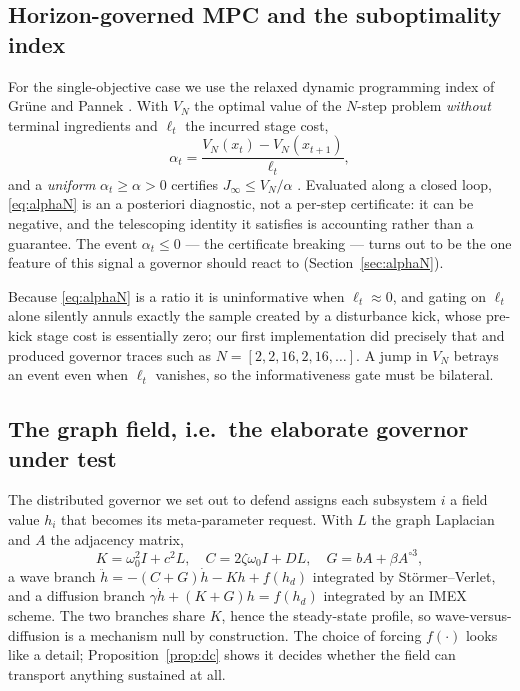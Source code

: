 \documentclass[journal]{IEEEtran}
\theoremstyle{definition}
\begin{document}
\subsection{Horizon-governed MPC and the suboptimality index}
For the single-objective case we use the relaxed dynamic programming index of
Gr\"une and Pannek
\cite{gruene2017nmpc,gruene2009analysis,lincoln2006relaxing}. With $V_N$ the
optimal value of the $N$-step problem \emph{without} terminal ingredients and
$\ell_t$ the incurred stage cost,
\begin{equation}
\alpha_t=\frac{V_N(x_t)-V_N(x_{t+1})}{\ell_t},
\label{eq:alphaN}
\end{equation}
and a \emph{uniform} $\alpha_t\ge\alpha>0$ certifies $J_\infty\le V_N/\alpha$
\cite{gruene2009analysis}. Evaluated along a closed loop, \eqref{eq:alphaN} is
an a posteriori diagnostic, not a per-step certificate: it can be negative, and
the telescoping identity it satisfies is accounting rather than a guarantee.
The event $\alpha_t\le0$ --- the certificate breaking --- turns out to be the
one feature of this signal a governor should react to
(Section~\ref{sec:alphaN}).

Because \eqref{eq:alphaN} is a ratio it is uninformative when
$\ell_t\approx0$, and gating on $\ell_t$ alone silently annuls exactly the
sample created by a disturbance kick, whose pre-kick stage cost is essentially
zero; our first implementation did precisely that and produced governor traces
such as $N=[2,2,16,2,16,\dots]$. A jump in $V_N$ betrays an event even when
$\ell_t$ vanishes, so the informativeness gate must be bilateral.

\subsection{The graph field, i.e.\ the elaborate governor under test}
\label{sec:field}
The distributed governor we set out to defend assigns each subsystem $i$ a
field value $h_i$ that becomes its meta-parameter request. With $L$ the graph
Laplacian and $A$ the adjacency matrix,
\begin{equation}
K=\omega_0^2 I+c^2L,\quad C=2\zeta\omega_0 I+DL,\quad G=bA+\beta A^{\circ 3},
\label{eq:operators}
\end{equation}
a wave branch $\ddot h=-(C+G)\dot h-Kh+f(h_d)$ integrated by
St\"ormer--Verlet, and a diffusion branch $\gamma\dot h+(K+G)h=f(h_d)$
integrated by an IMEX scheme. The two branches share $K$, hence the
steady-state profile, so wave-versus-diffusion is a mechanism null by
construction. The choice of forcing $f(\cdot)$ looks like a detail;
Proposition~\ref{prop:dc} shows it decides whether the field can transport
anything sustained at all.
\end{document}

